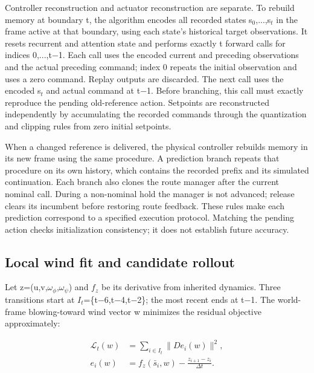 \documentclass[conference]{IEEEtran}
\begin{document}
Controller reconstruction and actuator reconstruction are separate. To rebuild memory at boundary t, the algorithm encodes all recorded states s\ensuremath{_0},...,s\ensuremath{_t} in the frame active at that boundary, using each state's historical target observations. It resets recurrent and attention state and performs exactly t forward calls for indices 0,...,t\ensuremath{-}1. Each call uses the encoded current and preceding observations and the actual preceding command; index 0 repeats the initial observation and uses a zero command. Replay outputs are discarded. The next call uses the encoded s\ensuremath{_t} and actual command at t\ensuremath{-}1. Before branching, this call must exactly reproduce the pending old-reference action. Setpoints are reconstructed independently by accumulating the recorded commands through the quantization and clipping rules from zero initial setpoints.

When a changed reference is delivered, the physical controller rebuilds memory in its new frame using the same procedure. A prediction branch repeats that procedure on its own history, which contains the recorded prefix and its simulated continuation. Each branch also clones the route manager after the current nominal call. During a non-nominal hold the manager is not advanced; release clears its incumbent before restoring route feedback. These rules make each prediction correspond to a specified execution protocol. Matching the pending action checks initialization consistency; it does not establish future accuracy.

\subsection{Local wind fit and candidate rollout}

Let z=(u,v,$\omega_\phi$,$\omega_\psi$) and $f_z$ be its derivative from inherited dynamics. Three transitions start at $I_t$=\{t\ensuremath{-}6,t\ensuremath{-}4,t\ensuremath{-}2\}; the most recent ends at t\ensuremath{-}1. The world-frame blowing-toward wind vector w minimizes the residual objective approximately:

\begin{equation}\label{eq:2}
\begin{aligned}\mathcal L_t(w)&=\sum_{i\in I_t}\|D e_i(w)\|^2,\\e_i(w)&=f_z(\bar s_i,w)-\frac{z_{i+1}-z_i}{\Delta t}.\end{aligned}
\end{equation}
\end{document}
